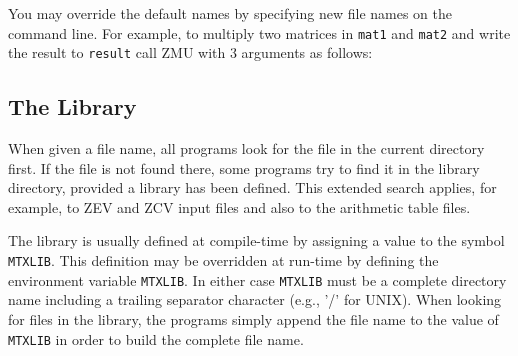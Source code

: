 You may override the default names by specifying new file names on the
command line. For example, to multiply two matrices in {\tt mat1} and
{\tt mat2} and write the result to {\tt result} call ZMU with
3 arguments as follows:



\subsection*{The Library}\label{sec:libdir}
When given a file name, all programs look for the file in the current
directory first. If the file is not found there, some programs try to
find it in the library directory, provided a library has been defined.
This extended search applies, for example, to ZEV and ZCV input files
and also to the arithmetic table files.

The library is usually defined at compile-time by assigning a
value to the symbol {\tt MTXLIB}. This definition may be overridden
at run-time by defining the environment variable {\tt MTXLIB}.
In either case {\tt MTXLIB} must be a complete directory name including
a trailing separator character (e.g., '/' for UNIX). When looking for
files in the library, the programs simply append the file name to the
value of {\tt MTXLIB} in order to build the complete file name.



